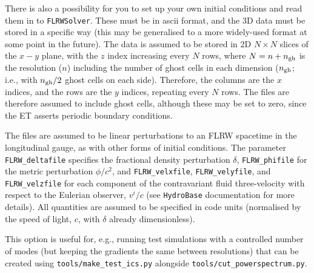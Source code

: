 There is also a possibility for you to set up your own initial conditions and read them in to \texttt{FLRWSolver}. These must be in ascii format, and the 3D data must be stored in a specific way (this may be generalised to a more widely-used format at some point in the future). The data is assumed to be stored in 2D $N\times N$ slices of the $x-y$ plane, with the $z$ index increasing every $N$ rows, where $N=n+n_{\rm gh}$ is the resolution ($n$) including the number of ghost cells in each dimension ($n_{\rm gh}$; i.e., with $n_{\rm gh}/2$ ghost cells on each side). Therefore, the columns are the $x$ indices, and the rows are the $y$ indices, repeating every $N$ rows. The files are therefore assumed to include ghost cells, although these may be set to zero, since the ET asserts periodic boundary conditions.

The files are assumed to be linear perturbations to an FLRW spacetime in the longitudinal gauge, as with other forms of initial conditions. The parameter \texttt{FLRW\_deltafile} specifies the fractional density perturbation $\delta$, \texttt{FLRW\_phifile} for the metric perturbation $\phi/c^2$, and \texttt{FLRW\_velxfile}, \texttt{FLRW\_velyfile}, and \texttt{FLRW\_velzfile} for each component of the contravariant fluid three-velocity with respect to the Eulerian observer, $v^i/c$ (see \texttt{HydroBase} documentation for more details). All quantities are assumed to be specified in code units (normalised by the speed of light, $c$, with $\delta$ already dimensionless).

This option is useful for, e.g., running test simulations with a controlled number of modes (but keeping the gradients the same between resolutions) that can be created using \texttt{tools/make\_test\_ics.py} alongside \texttt{tools/cut\_powerspectrum.py}.


